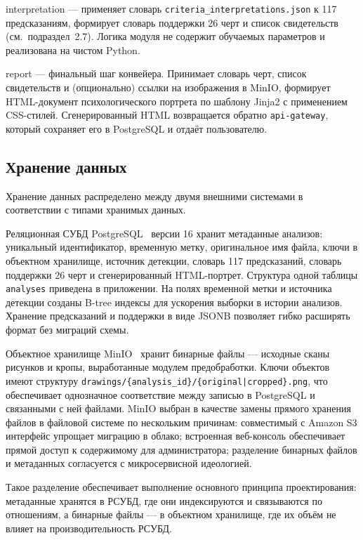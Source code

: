 interpretation --- применяет словарь \texttt{criteria\_interpretations.json} к 117 предсказаниям, формирует словарь поддержки 26 черт и список свидетельств (см.~подраздел~2.7). Логика модуля не содержит обучаемых параметров и реализована на чистом Python.

report --- финальный шаг конвейера. Принимает словарь черт, список свидетельств и (опционально) ссылки на изображения в MinIO, формирует HTML-документ психологического портрета по шаблону Jinja2 с применением CSS-стилей. Сгенерированный HTML возвращается обратно \texttt{api-gateway}, который сохраняет его в PostgreSQL и отдаёт пользователю.

\subsection{Хранение данных}

Хранение данных распределено между двумя внешними системами в соответствии с типами хранимых данных.

Реляционная СУБД PostgreSQL~\cite{postgres} версии 16 хранит метаданные анализов: уникальный идентификатор, временную метку, оригинальное имя файла, ключи в объектном хранилище, источник детекции, словарь 117 предсказаний, словарь поддержки 26 черт и сгенерированный HTML-портрет. Структура одной таблицы \texttt{analyses} приведена в приложении. На полях временной метки и источника детекции созданы B-tree индексы для ускорения выборки в истории анализов. Хранение предсказаний и поддержки в виде JSONB позволяет гибко расширять формат без миграций схемы.

Объектное хранилище MinIO~\cite{minio} хранит бинарные файлы --- исходные сканы рисунков и кропы, выработанные модулем предобработки. Ключи объектов имеют структуру \texttt{drawings/\{analysis\_id\}/\{original|cropped\}.png}, что обеспечивает однозначное соответствие между записью в PostgreSQL и связанными с ней файлами. MinIO выбран в качестве замены прямого хранения файлов в файловой системе по нескольким причинам: совместимый с Amazon S3 интерфейс упрощает миграцию в облако; встроенная веб-консоль обеспечивает прямой доступ к содержимому для администратора; разделение бинарных файлов и метаданных согласуется с микросервисной идеологией.

Такое разделение обеспечивает выполнение основного принципа проектирования: метаданные хранятся в РСУБД, где они индексируются и связываются по отношениям, а бинарные файлы --- в объектном хранилище, где их объём не влияет на производительность РСУБД.


